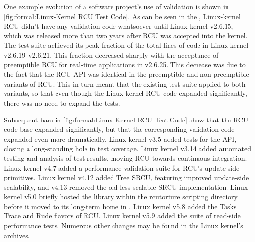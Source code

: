 One example evolution of a software project's use of validation is
shown in
\cref{fig:formal:Linux-Kernel RCU Test Code}.
As can be seen in the ,
Linux-kernel RCU didn't have any validation code whatsoever until Linux
kernel v2.6.15, which was released more than two years after RCU was
accepted into the kernel.
The test suite achieved its peak fraction of the total lines of code
in Linux kernel v2.6.19--v2.6.21.
This fraction decreased sharply with the acceptance of preemptible RCU
for real-time applications in v2.6.25.
This decrease was due to the fact that the RCU API was identical
in the preemptible and non-preemptible variants of RCU\@.
This in turn meant that the existing test suite applied to both variants,
so that even though the Linux-kernel RCU code expanded significantly,
there was no need to expand the tests.

Subsequent bars in \cref{fig:formal:Linux-Kernel RCU Test Code} show
that the RCU code base expanded significantly, but that the
corresponding validation code expanded even more dramatically.
Linux kernel v3.5 added tests for the  API, closing
a long-standing hole in test coverage.
Linux kernel v3.14 added automated testing and analysis of test results,
moving RCU towards continuous integration.
Linux kernel v4.7 added a performance validation suite for RCU's update-side
primitives.
Linux kernel v4.12 added Tree SRCU, featuring improved update-side
scalability, and v4.13 removed the old less-scalable SRCU implementation.
Linux kernel v5.0 briefly hosted the  library within
the rcutorture scripting directory before it moved to its long-term
home in .
Linux kernel v5.8 added the Tasks Trace and Rude flavors of RCU\@.
Linux kernel v5.9 added the  suite of read-side performance
tests.
Numerous other changes may be found in the Linux kernel's  archives.

